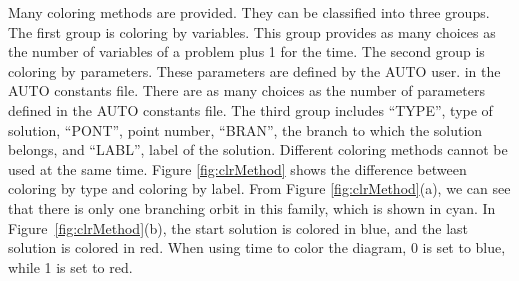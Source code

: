 Many coloring methods are provided. They can be classified into three groups. The first group
is coloring by variables. 
This group provides as many choices as the number of variables of a problem plus
1 for the time. 
The second group is coloring by parameters. These parameters are defined by the AUTO user. 
in the AUTO constants file. 
There are as many choices as the number of parameters defined in the AUTO constants file.
The third group includes ``TYPE'', type of solution, 
``PONT'', point number, 
``BRAN'', the branch to which the solution belongs, 
and ``LABL'', label of the solution. 
Different coloring methods cannot be used at the same time.
Figure \ref{fig:clrMethod} shows the difference between coloring by type and coloring by label. 
From Figure \ref{fig:clrMethod}(a), we can see that there is only one
branching orbit in this family, which is shown in cyan. 
In Figure~\ref{fig:clrMethod}(b), the start solution is colored in blue, and the last solution is colored in red. 
When using time to color the diagram, 0 is set to blue, while 1 is set to red. 
